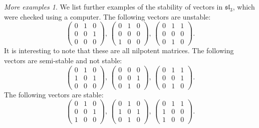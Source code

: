 \documentclass[12pt]{amsart}
\theoremstyle{remark}
\theoremstyle{remark}
\theoremstyle{remark}
\newtheorem*{moreexamples}{More examples}
\begin{document}
\begin{moreexamples}
We list further examples of the stability of vectors in $\mathfrak{sl}_3$, which were checked using a computer.
The following vectors are unstable:
$$
\begin{pmatrix} 
	0 & 1 & 0 \\ 
	0 & 0 & 1 \\
	0 & 0 & 0 
\end{pmatrix}, \, 
\begin{pmatrix} 
	0 & 1 & 0 \\ 
	0 & 0 & 0 \\
	1 & 0 & 0 
\end{pmatrix}, \, 
\begin{pmatrix} 
	0 & 1 & 1 \\ 
	0 & 0 & 0 \\
	0 & 1 & 0 
\end{pmatrix}.
$$
It is interesting to note that these are all nilpotent matrices.
The following vectors are semi-stable and not stable:
$$
\begin{pmatrix} 
	0 & 1 & 0 \\ 
	1 & 0 & 1 \\
	0 & 0 & 0 
\end{pmatrix}, \, 
\begin{pmatrix} 
	0 & 0 & 0 \\ 
	0 & 0 & 1 \\
	0 & 1 & 0 
\end{pmatrix}, \, 
\begin{pmatrix} 
	0 & 1 & 1 \\ 
	0 & 0 & 1 \\
	0 & 1 & 0 
\end{pmatrix}.
$$
The following vectors are stable:
$$
\begin{pmatrix} 
	0 & 1 & 0 \\ 
	0 & 0 & 1 \\
	1 & 0 & 0 
\end{pmatrix}, \, 
\begin{pmatrix} 
	0 & 1 & 0 \\ 
	1 & 0 & 1 \\
	0 & 1 & 0 
\end{pmatrix}, \, 
\begin{pmatrix} 
	0 & 1 & 1 \\ 
	1 & 0 & 0 \\
	1 & 0 & 0 
\end{pmatrix}.
$$ \\
\end{moreexamples}
\end{document}
